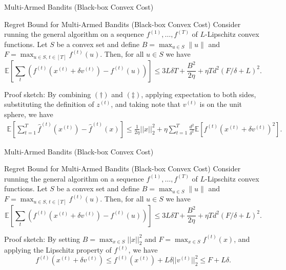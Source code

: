 \begin{frame}{Multi-Armed Bandits (Black-box Convex Cost)}
\small
\begin{block}{Regret Bound for Multi-Armed Bandits (Black-box Convex Cost)}
    Consider running the general algorithm on a
    sequence $f^{(1)}, \ldots, f^{(T)}$ of $L$-Lipschitz convex functions. Let $S$ be a
    convex set and define $B = \max_{u \in S} \|u\|$ and
    $F = \max_{u \in S,\, t \in [T]} f^{(t)}(u)$. Then, for all $u \in S$ we have
    $$
    \mathbb{E}\left[\sum_t \left(f^{(t)}(x^{(t)} + \delta v^{(t)}) - f^{(t)}(u)\right)\right]
    \leq 3L\delta T + \frac{B^2}{2\eta} + \eta T d^2 (F/\delta + L)^2.
    $$
\end{block}
Proof sketch:
By combining $(\dag)$ and $(\ddag)$, applying expectation to both sides, substituting the definition of $z^{(t)}$, and taking note that $v^{(t)}$ is on the unit sphere, we have
\begin{align*}
    \mathbb{E}\left[\sum_{t=1}^T \hat{f}^{(t)}(x^{(t)}) - \hat{f}^{(t)}(x) \right] \leq \frac{1}{2\eta}||x||_2^2 + \eta \sum_{t=1}^T \frac{d^2}{\delta^2} \mathbb{E}\left[f^{(t)}(x^{(t)} + \delta v^{(t)})^2\right].
\end{align*}
\end{frame}

\begin{frame}{Multi-Armed Bandits (Black-box Convex Cost)}
\small
\begin{block}{Regret Bound for Multi-Armed Bandits (Black-box Convex Cost)}
    Consider running the general algorithm on a
    sequence $f^{(1)}, \ldots, f^{(T)}$ of $L$-Lipschitz convex functions. Let $S$ be a
    convex set and define $B = \max_{u \in S} \|u\|$ and
    $F = \max_{u \in S,\, t \in [T]} f^{(t)}(u)$. Then, for all $u \in S$ we have
    $$
    \mathbb{E}\left[\sum_t \left(f^{(t)}(x^{(t)} + \delta v^{(t)}) - f^{(t)}(u)\right)\right]
    \leq 3L\delta T + \frac{B^2}{2\eta} + \eta T d^2 (F/\delta + L)^2.
    $$
\end{block}
Proof sketch:
By setting $B = \max_{x \in S} ||x||_2^2$ and $F = \max_{x \in S} f^{(t)}(x)$, and applying the Lipschitz property of $f^{(t)}$, we have
$$ f^{(t)}(x^{(t)} + \delta v^{(t)}) \leq f^{(t)}(x^{(t)}) + L \delta ||v^{(t)}||_2^2 \leq F + L\delta. $$
\end{frame}

